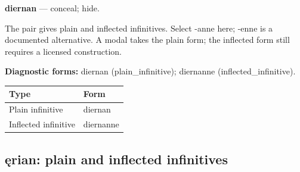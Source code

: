 \par\begin{minipage}{\linewidth}\raggedright
\textbf{diernan} — conceal; hide.

The pair gives plain and inflected infinitives. Select -anne here; -enne is a documented alternative. A modal takes the plain form; the inflected form still requires a licensed construction.

\textbf{Diagnostic forms:} diernan (plain\_infinitive); diernanne (inflected\_infinitive).

\par\begingroup
\fontsize{10.5}{13.2}\selectfont
\setlength{\LTleft}{0pt}\setlength{\LTright}{\fill}
\noindent
\begin{tabular}{@{}>{\raggedright\arraybackslash}p{71.72mm}>{\raggedright\arraybackslash}p{49.46mm}@{}}
\toprule
\textbf{Type} & \textbf{Form} \\
\midrule
Plain infinitive & diernan \\
Inflected infinitive & diernanne \\
\bottomrule
\end{tabular}
\par\endgroup

\end{minipage}\par
{}
\subsection*{ęrian: plain and inflected infinitives}

